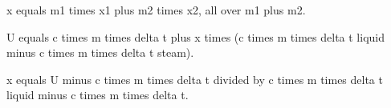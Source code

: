 x equals m1 times x1 plus m2 times x2, all over m1 plus m2.

U equals c times m times delta t plus x times (c times m times delta t liquid minus c times m times delta t steam).

x equals U minus c times m times delta t divided by c times m times delta t liquid minus c times m times delta t.